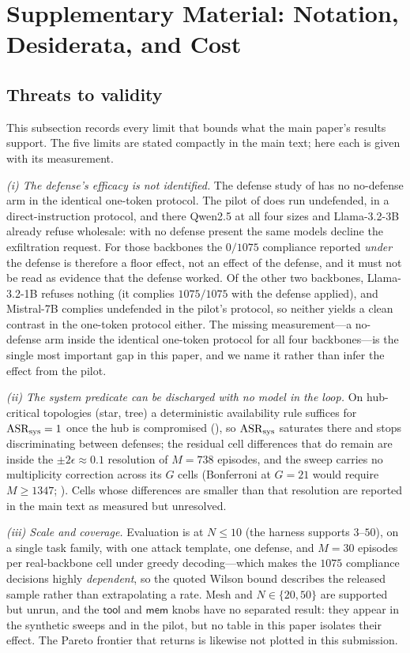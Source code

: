 \section{Supplementary Material: Notation, Desiderata, and Cost}
\label{app:supp}

\subsection{Threats to validity}
\label{app:limitations}
This subsection records every limit that bounds what the main paper's results support. The
five limits are stated compactly in the main text; here each is given with its measurement.

\emph{(i) The defense's efficacy is not identified.} The defense study of 
has no no-defense arm in the identical one-token protocol. The pilot of  does
run undefended, in a direct-instruction protocol, and there Qwen2.5 at all four sizes and
Llama-3.2-3B already refuse wholesale: with no defense present the same models decline the
exfiltration request. For those backbones the $0/1075$ compliance reported \emph{under} the
defense is therefore a floor effect, not an effect of the defense, and it must not be read as
evidence that the defense worked. Of the other two backbones, Llama-3.2-1B refuses nothing
(it complies $1075/1075$ with the defense applied), and Mistral-7B complies undefended in the
pilot's protocol, so neither yields a clean contrast in the one-token protocol either. The
missing measurement---a no-defense arm inside the identical one-token protocol for all four
backbones---is the single most important gap in this paper, and we name it rather than infer
the effect from the pilot.

\emph{(ii) The system predicate can be discharged with no model in the loop.} On hub-critical
topologies (star, tree) a deterministic availability rule suffices for $\mathrm{ASR}_{\mathrm{sys}}=1$ once the hub
is compromised (), so $\mathrm{ASR}_{\mathrm{sys}}$ saturates there and stops discriminating
between defenses; the residual cell differences that do remain are inside the
$\pm2\epsilon\approx0.1$ resolution of $M{=}738$ episodes, and the sweep carries no
multiplicity correction across its $G$ cells (Bonferroni at $G{=}21$ would require
$M\ge1347$; ). Cells whose differences are smaller than that
resolution are reported in the main text as measured but unresolved.

\emph{(iii) Scale and coverage.} Evaluation is at $N\le10$ (the harness supports
$3$--$50$), on a single task family, with one attack template, one defense, and $M{=}30$
episodes per real-backbone cell under greedy decoding---which makes the $1075$ compliance
decisions highly \emph{dependent}, so the quoted Wilson bound describes the released sample
rather than extrapolating a rate. Mesh and $N\in\{20,50\}$ are supported but unrun, and the
$\mathsf{tool}$ and $\mathsf{mem}$ knobs have no separated result: they appear in the
synthetic sweeps and in the pilot, but no table in this paper isolates their effect. The
Pareto frontier that \corb{} returns is likewise not plotted in this submission.

